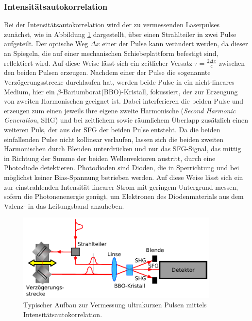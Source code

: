       \subsubsection{Intensitätsautokorrelation}  
      \label{sec:AK47}
        Bei der Intensitätsautokorrelation wird der zu vermessenden Laserpulses zunächst, wie in Abbildung \ref{fig:autokorrelator} dargestellt, über einen Strahlteiler in zwei Pulse aufgeteilt. 
        Der optische Weg $\Delta x$ einer der Pulse kann verändert werden, da dieser an Spiegeln, die auf einer mechanischen Schiebeplattform befestigt sind, reflektiert wird. Auf diese Weise lässt sich 
        ein zeitlicher Versatz $\tau=\frac{2\Delta x}{\text{c}}$ zwischen den beiden Pulsen erzeugen. Nachdem einer der Pulse die sogenannte Verzögerungsstrecke durchlaufen hat, werden beide Pulse in ein 
        nicht-lineares Medium, hier ein 
        $\beta$-Bariumborat(BBO)-Kristall, fokussiert, der zur Erzeugung von zweiten Harmonischen geeignet ist. Dabei interferieren die beiden Pulse und erzeugen zum einen jeweils ihre eigene zweite Harmonische 
        (\textit{Second Harmonic Generation}, SHG) und bei zeitlichem sowie räumlichem Überlapp zusätzlich einen weiteren Puls, der aus der SFG der beiden Pulse entsteht. Da die beiden einfallenden Pulse nicht 
        kollinear verlaufen, lassen sich die beiden zweiten Harmonischen durch Blenden unterdrücken und nur das SFG-Signal, das mittig in Richtung der Summe der beiden Wellenvektoren austritt, durch eine 
        Photodiode detektieren. Photodioden sind Dioden, die in Sperrichtung und 
        bei möglichst keiner Bias-Spannung betrieben werden. Auf diese Weise lässt sich ein zur einstrahlenden Intensität linearer Strom mit geringem Untergrund messen, sofern die Photonenenergie genügt, um
        Elektronen des Diodenmaterials aus dem Valenz- in das Leitungsband anzuheben.  
        \FloatBarrier
        \begin{figure}[h]
          \centering
          \includegraphics[width = 0.9\textwidth]{pictures/autokorrelator.pdf}
          \caption{Typischer Aufbau zur Vermessung ultrakurzen Pulsen mittels Intensitätsautokorrelation.}
          \label{fig:autokorrelator}
        \end{figure}
